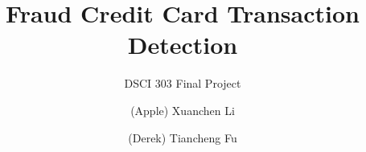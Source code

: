 \documentclass[sigconf, nonacm]{acmart}
\begin{document}
\title{Fraud Credit Card Transaction Detection}
\subtitle{DSCI 303 Final Project}

\author{(Apple) Xuanchen Li}

\author{(Derek) Tiancheng Fu}






\end{document}
